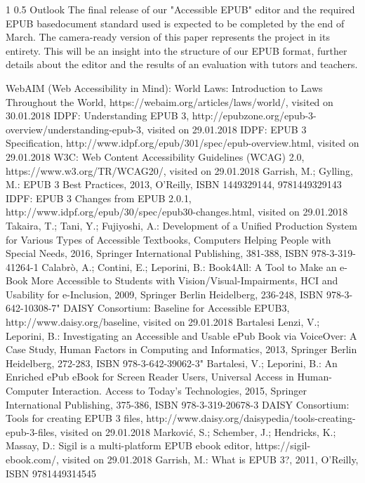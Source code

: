 \documentclass[12pt]{llncs}
\makeatletter
\renewcommand\section{\@startsection 
   {section}{1}{0mm}%
   {1\baselineskip}%
   {0.5\baselineskip}%
   {\bfseries\Large}%
   }
\makeatother
\begin{document}
\section{Outlook}
The final release of our "Accessible EPUB" editor and the required EPUB basedocument standard used is expected to be completed by the end of March. The camera-ready version of this paper represents the project in its entirety. This will be an insight into the structure of our EPUB format, further details about the editor and the results of an evaluation with tutors and teachers. 

%
%
\begin{thebibliography}{}
%
 WebAIM (Web Accessibility in Mind): World Laws: Introduction to Laws Throughout the World, https://webaim.org/articles/laws/world/, visited on 30.01.2018
 IDPF: Understanding EPUB 3, http://epubzone.org/epub-3-overview/understanding-epub-3, visited on 29.01.2018
 IDPF: EPUB 3 Specification, http://www.idpf.org/epub/301/spec/epub-overview.html, visited on 29.01.2018
 W3C: Web Content Accessibility Guidelines (WCAG) 2.0, https://www.w3.org/TR/WCAG20/, visited on 29.01.2018
 Garrish, M.; Gylling, M.: EPUB 3 Best Practices, 2013, O'Reilly, ISBN 1449329144, 9781449329143
 IDPF: EPUB 3 Changes from EPUB 2.0.1, http://www.idpf.org/epub/30/spec/epub30-changes.html, visited on 29.01.2018
 Takaira, T.; Tani, Y.; Fujiyoshi, A.: Development of a Unified Production System for Various Types of Accessible Textbooks, Computers Helping People with Special Needs, 2016, Springer International Publishing, 381-388, ISBN 978-3-319-41264-1
 Calabr{\`o}, A.; Contini, E.; Leporini, B.: Book4All: A Tool to Make an e-Book More Accessible to Students with Vision/Visual-Impairments, HCI and Usability for e-Inclusion, 2009, Springer Berlin Heidelberg, 236-248, ISBN 978-3-642-10308-7"
 DAISY Consortium: Baseline for Accessible EPUB3, http://www.daisy.org/baseline, visited on 29.01.2018
 Bartalesi Lenzi, V.; Leporini, B.: Investigating an Accessible and Usable ePub Book via VoiceOver: A Case Study, Human Factors in Computing and Informatics, 2013, Springer Berlin Heidelberg, 272-283, ISBN 978-3-642-39062-3"
 Bartalesi, V.; Leporini, B.: An Enriched ePub eBook for Screen Reader Users, Universal Access in Human-Computer Interaction. Access to Today's Technologies, 2015, Springer International Publishing, 375-386, ISBN 978-3-319-20678-3
 DAISY Consortium: Tools for creating EPUB 3 files, http://www.daisy.org/daisypedia/tools-creating-epub-3-files, visited on 29.01.2018
 Marković, S.; Schember, J.; Hendricks, K.; Massay, D.: Sigil is a multi-platform EPUB ebook editor, https://sigil-ebook.com/, visited on 29.01.2018
 Garrish, M.: What is EPUB 3?, 2011, O'Reilly, ISBN 9781449314545

\end{thebibliography}
\end{document}
